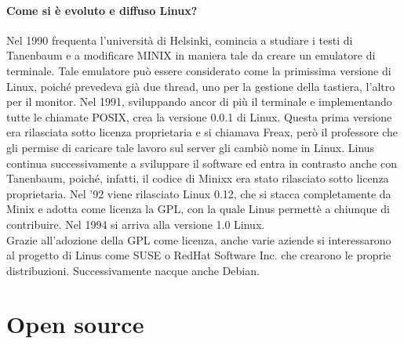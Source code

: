 \documentclass[a4paper]{article}
\begin{document}
		\paragraph{Come si è evoluto e diffuso Linux?}
		Nel 1990 frequenta l'università di Helsinki, comincia a studiare i testi di Tanenbaum e a modificare MINIX in maniera tale da creare un emulatore di terminale. Tale emulatore può essere considerato come la primissima versione di Linux, poiché prevedeva già due thread, uno per la gestione della tastiera, l'altro per il monitor. Nel 1991, sviluppando ancor di più il terminale e implementando tutte le chiamate POSIX, crea la versione 0.0.1 di Linux. Questa prima versione era rilasciata sotto licenza proprietaria e si chiamava Freax, però il professore che gli permise di caricare tale lavoro sul server gli cambiò nome in Linux. Linus continua successivamente a sviluppare il software ed entra in contrasto anche con Tanenbaum, poiché, infatti, il codice di Minixx era stato rilasciato sotto licenza proprietaria. Nel '92 viene rilasciato Linux 0.12, che si stacca completamente da Minix e adotta come licenza la GPL, con la quale Linus permettè a chiunque di contribuire. Nel 1994 si arriva alla versione 1.0 Linux. \\
		Grazie all'adozione della GPL come licenza, anche varie aziende si interessarono al progetto di Linus come SUSE o RedHat Software Inc. che crearono le proprie distribuzioni. Successivamente nacque anche Debian. 
	
	\section{Open source}	
\end{document}
